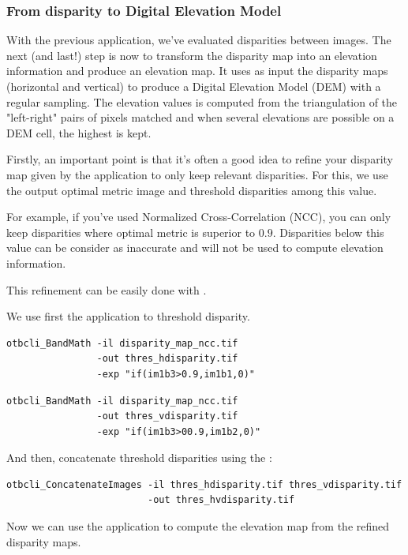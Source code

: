 \subsubsection{From disparity to Digital Elevation Model}

With the previous application, we've evaluated disparities between images. The
next (and last!) step is now to transform the disparity map into an elevation
information and produce an elevation map. It uses as input the disparity maps
(horizontal and vertical) to produce a Digital Elevation Model (DEM) with a
regular sampling. The elevation values is computed from the triangulation of the
"left-right" pairs of pixels matched and when several elevations are possible on
a DEM cell, the highest is kept.

Firstly, an important point is that it's often a good idea to refine your disparity
map given by the  application to only keep relevant
disparities. For this, we use the output optimal metric image and threshold
disparities among this value.

For example, if you've used Normalized Cross-Correlation (NCC), you can only
keep disparities where optimal metric is superior to $0.9$. Disparities below
this value can be consider as inaccurate and will not be used to compute
elevation information.

This refinement can be easily done with \app.

We use first the  application to threshold disparity.

\begin{verbatim}
otbcli_BandMath -il disparity_map_ncc.tif
                -out thres_hdisparity.tif
                -exp "if(im1b3>0.9,im1b1,0)"
\end{verbatim}

\begin{verbatim}
otbcli_BandMath -il disparity_map_ncc.tif
                -out thres_vdisparity.tif
                -exp "if(im1b3>00.9,im1b2,0)"
\end{verbatim}

And then, concatenate threshold disparities using the :

\begin{verbatim}
otbcli_ConcatenateImages -il thres_hdisparity.tif thres_vdisparity.tif
                         -out thres_hvdisparity.tif
\end{verbatim}

Now we can use the  application to
compute the elevation map from the refined disparity maps.

